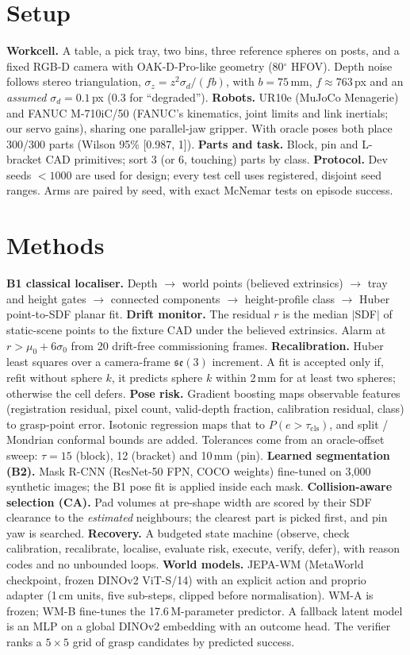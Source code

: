 \documentclass[10pt,twocolumn]{article}
\begin{document}
\section{Setup}
\textbf{Workcell.} A table, a pick tray, two bins, three reference spheres on posts, and a fixed RGB-D camera with
OAK-D-Pro-like geometry (80$^\circ$ HFOV). Depth noise follows stereo triangulation, $\sigma_z = z^2\sigma_d/(f b)$,
with $b=75$\,mm, $f\approx763$\,px and an \emph{assumed} $\sigma_d=0.1$\,px (0.3 for ``degraded'').
\textbf{Robots.} UR10e (MuJoCo Menagerie) and FANUC M-710iC/50 (FANUC's kinematics, joint limits and link inertials;
our servo gains), sharing one parallel-jaw gripper. With oracle poses both place 300/300 parts (Wilson 95\% [0.987, 1]).
\textbf{Parts and task.} Block, pin and L-bracket CAD primitives; sort 3 (or 6, touching) parts by class.
\textbf{Protocol.} Dev seeds $<1000$ are used for design; every test cell uses registered, disjoint seed ranges. Arms
are paired by seed, with exact McNemar tests on episode success.

\section{Methods}
\textbf{B1 classical localiser.} Depth $\to$ world points (believed extrinsics) $\to$ tray and height gates $\to$
connected components $\to$ height-profile class $\to$ Huber point-to-SDF planar fit.
\textbf{Drift monitor.} The residual $r$ is the median $|$SDF$|$ of static-scene points to the fixture CAD under the
believed extrinsics. Alarm at $r > \mu_0 + 6\sigma_0$ from 20 drift-free commissioning frames.
\textbf{Recalibration.} Huber least squares over a camera-frame $\mathfrak{se}(3)$ increment. A fit is accepted only
if, refit without sphere $k$, it predicts sphere $k$ within 2\,mm for at least two spheres; otherwise the cell defers.
\textbf{Pose risk.} Gradient boosting maps observable features (registration residual, pixel count, valid-depth
fraction, calibration residual, class) to grasp-point error. Isotonic regression maps that to
$P(e>\tau_{\text{cls}})$, and split / Mondrian conformal bounds are added. Tolerances come from an oracle-offset sweep:
$\tau=15$ (block), 12 (bracket) and 10\,mm (pin).
\textbf{Learned segmentation (B2).} Mask R-CNN (ResNet-50 FPN, COCO weights) fine-tuned on 3{,}000 synthetic images;
the B1 pose fit is applied inside each mask.
\textbf{Collision-aware selection (CA).} Pad volumes at pre-shape width are scored by their SDF clearance to the
\emph{estimated} neighbours; the clearest part is picked first, and pin yaw is searched.
\textbf{Recovery.} A budgeted state machine (observe, check calibration, recalibrate, localise, evaluate risk,
execute, verify, defer), with reason codes and no unbounded loops.
\textbf{World models.} JEPA-WM (MetaWorld checkpoint, frozen DINOv2 ViT-S/14) with an explicit action and proprio
adapter (1\,cm units, five sub-steps, clipped before normalisation). WM-A is frozen; WM-B fine-tunes the 17.6\,M-parameter
predictor. A fallback latent model is an MLP on a global DINOv2 embedding with an outcome head. The verifier ranks a
$5\times5$ grid of grasp candidates by predicted success.
\end{document}
